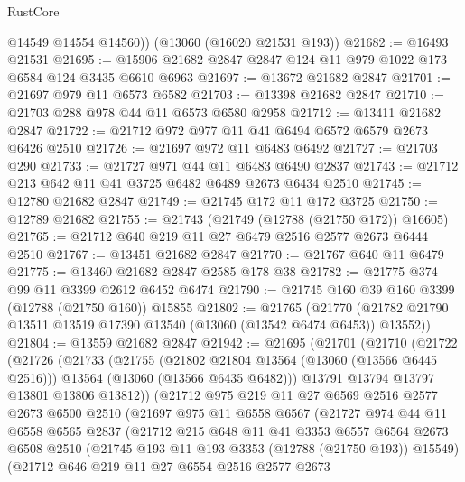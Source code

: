 \begin{lexlean}{RustCore}
\begin{coremodule}
        @14549
        @14554
        @14560))
    (@13060 (@16020 @21531 @193))
@21682 := @16493 @21531
@21695 := @15906 @21682 @2847 @2847 @124 @11 @979 @1022 @173 @6584 @124 @3435 @6610 @6963
@21697 := @13672 @21682 @2847
@21701 := @21697 @979 @11 @6573 @6582
@21703 := @13398 @21682 @2847
@21710 := @21703 @288 @978 @44 @11 @6573 @6580 @2958
@21712 := @13411 @21682 @2847
@21722 := @21712 @972 @977 @11 @41 @6494 @6572 @6579 @2673 @6426 @2510
@21726 := @21697 @972 @11 @6483 @6492
@21727 := @21703 @290
@21733 := @21727 @971 @44 @11 @6483 @6490 @2837
@21743 := @21712 @213 @642 @11 @41 @3725 @6482 @6489 @2673 @6434 @2510
@21745 := @12780 @21682 @2847
@21749 := @21745 @172 @11 @172 @3725
@21750 := @12789 @21682
@21755 := @21743 (@21749 (@12788 (@21750 @172)) @16605)
@21765 := @21712 @640 @219 @11 @27 @6479 @2516 @2577 @2673 @6444 @2510
@21767 := @13451 @21682 @2847
@21770 := @21767 @640 @11 @6479
@21775 := @13460 @21682 @2847 @2585 @178 @38
@21782 := @21775 @374 @99 @11 @3399 @2612 @6452 @6474
@21790 := @21745 @160 @39 @160 @3399 (@12788 (@21750 @160)) @15855
@21802 := @21765
    (@21770 (@21782 @21790 @13511 @13519 @17390 @13540 (@13060 (@13542 @6474 @6453)) @13552))
@21804 := @13559 @21682 @2847
@21942 := @21695
    (@21701
      (@21710
        (@21722
          (@21726
            (@21733
              (@21755
                (@21802 @21804 @13564 (@13060 (@13566 @6445 @2516)))
                @13564
                (@13060 (@13566 @6435 @6482)))
              @13791
              @13794
              @13797
              @13801
              @13806
              @13812))
          (@21712
            @975
            @219
            @11
            @27
            @6569
            @2516
            @2577
            @2673
            @6500
            @2510
            (@21697
              @975
              @11
              @6558
              @6567
              (@21727
                @974
                @44
                @11
                @6558
                @6565
                @2837
                (@21712
                  @215
                  @648
                  @11
                  @41
                  @3353
                  @6557
                  @6564
                  @2673
                  @6508
                  @2510
                  (@21745 @193 @11 @193 @3353 (@12788 (@21750 @193)) @15549)
                  (@21712
                    @646
                    @219
                    @11
                    @27
                    @6554
                    @2516
                    @2577
                    @2673

\end{coremodule}
\end{lexlean}
